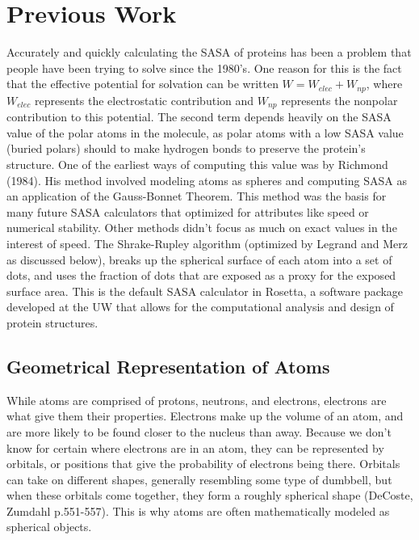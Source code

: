 \documentclass{article}
\begin{document}
\section{Previous Work}
Accurately and quickly calculating the SASA of proteins has been a problem that people have been trying to solve since the 1980's. One reason for this is the fact that the effective potential for solvation can be written $W=W_{elec}+W_{np}$, where $W_{elec}$ represents the electrostatic contribution and $W_{np}$ represents the nonpolar contribution to this potential. The second term depends heavily on the SASA value of the polar atoms in the molecule, as polar atoms with a low SASA value (buried polars) should to make hydrogen bonds to preserve the protein's structure. One of the earliest ways of computing this value was by Richmond (1984). His method involved modeling atoms as spheres and computing SASA as an application of the Gauss-Bonnet Theorem. This method was the basis for many future SASA calculators that optimized for attributes like speed or numerical stability. Other methods didn't focus as much on exact values in the interest of speed. The Shrake-Rupley algorithm (optimized by Legrand and Merz as discussed below), breaks up the spherical surface of each atom into a set of dots, and uses the fraction of dots that are exposed as a proxy for the exposed surface area. This is the default SASA calculator in Rosetta, a software package developed at the UW that allows for the computational analysis and design of protein structures. 
\subsection{Geometrical Representation of Atoms}
While atoms are comprised of protons, neutrons, and electrons, electrons are what give them their properties. Electrons make up the volume of an atom, and are more likely to be found closer to the nucleus than away. Because we don’t know for certain where electrons are in an atom, they can be represented by orbitals, or positions that give the probability of electrons being there. Orbitals can take on different shapes, generally resembling some type of dumbbell, but when these orbitals come together, they form a roughly spherical shape (DeCoste, Zumdahl p.551-557). This is why atoms are often mathematically modeled as spherical objects.
\end{document}
